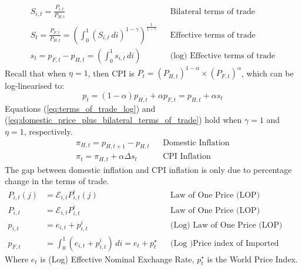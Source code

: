 \begin{align}
    S_{i,t} = \frac{P_{i,t}}{P_{H,t}}                                                                                                     &  & \text{Bilateral terms of trade}       \\
    S_{t} =  \frac{P_{F,t}}{P_{H,t}} = \left(\int_{0}^{1} (S_{i,t} \, di)^{1-\gamma}\right)^{\frac{1}{1-\gamma}}                          &  & \text{Effective terms of trade}       \\
    s_t = p_{F,t} - p_{H,t} = \left(\int_{0}^{1} s_{i,t} \, di \right)                                      \label{eq:terms_of_trade_log} &  & \text{(log) Effective terms of trade}
\end{align}
Recall that when $\eta = 1$, then CPI is $P_t = (P_{H,t})^{1-\alpha} \times (P_{F,t})^{\alpha}$, which can be log-linearised to:
\begin{equation}
    p_t = (1-\alpha)p_{H,t} + \alpha p_{F,t} = p_{H,t} + \alpha s_t \label{eq:domestic_price_plus_bilateral_terms_of_trade}
\end{equation}
Equations (\ref{eq:terms_of_trade_log}) and (\ref{eq:domestic_price_plus_bilateral_terms_of_trade}) hold when $\gamma=1$ and $\eta = 1$, respectively.
\begin{align}
    \pi_{H,t} = p_{H,t+1} - p_{H,t}         &  & \text{Domestic Inflation} \\
    \pi_{t} = \pi_{H,t} + \alpha \Delta s_t &  & \text{CPI Inflation}
\end{align}
The gap between domestic inflation and CPI inflation is only due to percentage change in the terms of trade.
\begin{align}
    P_{i,t}(j) & = \mathcal{E}_{i,t}P_{i,t}^i(j)                                                                         &  & \text{Law of One Price (LOP)}              \\
    P_{i,t}    & = \mathcal{E}_{i,t}P_{i,t}^i                                                                            &  & \text{Law of One Price (LOP)}              \\
    p_{i,t}    & = e_{i,t}+p_{i,t}^i                                                                                     &  & \text{(Log) Law of One Price (LOP)}        \\
    p_{F,t}    & = \int_{0}^{1}(e_{i,t}+p_{i,t}^i) \,di = e_t + p_t^{\star} \label{eq:log_price_index_of_imported_goods} &  & \text{(Log )Price index of Imported Goods}
\end{align}
Where $e_t$ is (Log) Effective Nominal Exchange Rate, $p_t^{\star}$ is the World Price Index.
